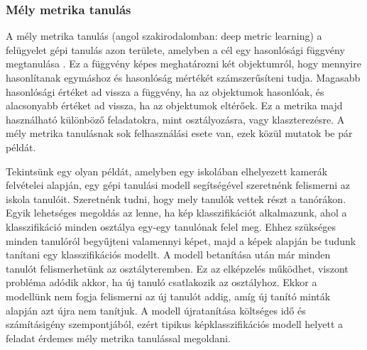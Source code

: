 \subsubsection{Mély metrika tanulás}
\label{sec:dml}

A mély metrika tanulás (angol szakirodalomban: deep metric learning) a felügyelet gépi tanulás azon területe, amelyben a cél egy hasonlósági függvény megtanulása \cite{kaya2019dmlsurvey}. Ez a függvény képes meghatározni két objektumról, hogy mennyire hasonlítanak egymáshoz és hasonlóság mértékét számszerűsíteni tudja. Magasabb hasonlósági értéket ad vissza a függvény, ha az objektumok hasonlóak, és alacsonyabb értéket ad vissza, ha az objektumok eltérőek. Ez a metrika majd használható különböző feladatokra, mint osztályozásra, vagy klaszterezésre. A mély metrika tanulásnak sok felhasználási esete van, ezek közül mutatok be pár példát.


Tekintsünk egy olyan példát, amelyben egy iskolában elhelyezett kamerák felvételei alapján, egy gépi tanulási modell segítségével szeretnénk felismerni az iskola tanulóit. Szeretnénk tudni, hogy mely tanulók vettek részt a tanórákon. Egyik lehetséges megoldás az lenne, ha kép klasszifikációt alkalmazunk, ahol a klasszifikáció minden osztálya egy-egy tanulónak felel meg. Ehhez szükséges minden tanulóról begyűjteni valamennyi képet, majd a képek alapján be tudunk tanítani egy klasszifikációs modellt. A modell betanítása után már minden tanulót felismerhetünk az osztályteremben. Ez az elképzelés működhet, viszont probléma adódik akkor, ha új tanuló csatlakozik az osztályhoz. Ekkor a modellünk nem fogja felismerni az új tanulót addig, amíg új tanító minták alapján azt újra nem tanítjuk. A modell újratanítása költséges idő és számításigény szempontjából, ezért tipikus képklasszifikációs modell helyett a feladat érdemes mély metrika tanulással megoldani.


